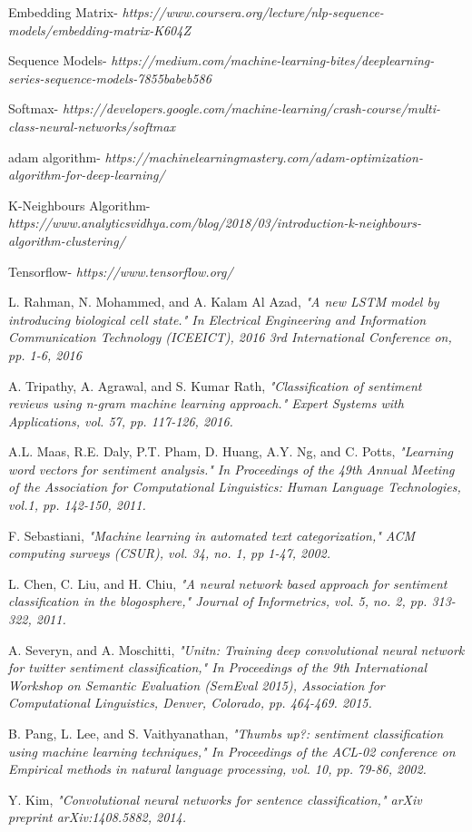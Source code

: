 \documentclass[conference]{IEEEtran}
\begin{document}
\begin{thebibliography}{00}
Embedding Matrix-
{\em https://www.coursera.org/lecture/nlp-sequence-models/embedding-matrix-K604Z}

Sequence Models-
{\em https://medium.com/machine-learning-bites/deeplearning-series-sequence-models-7855babeb586}

Softmax-
{\em https://developers.google.com/machine-learning/crash-course/multi-class-neural-networks/softmax}

adam algorithm-
{\em https://machinelearningmastery.com/adam-optimization-algorithm-for-deep-learning/}

K-Neighbours Algorithm-
{\em https://www.analyticsvidhya.com/blog/2018/03/introduction-k-neighbours-algorithm-clustering/}

Tensorflow-
{\em https://www.tensorflow.org/}

L. Rahman, N. Mohammed, and A. Kalam Al Azad,
{\em  "A new LSTM
model by introducing biological cell state." In Electrical Engineering
and Information Communication Technology (ICEEICT), 2016 3rd
International Conference on, pp. 1-6, 2016}

A. Tripathy, A. Agrawal, and S. Kumar Rath,
{\em  "Classification of
sentiment reviews using n-gram machine learning approach." Expert
Systems with Applications, vol. 57, pp. 117-126, 2016. }

 A.L. Maas, R.E. Daly, P.T. Pham, D. Huang, A.Y. Ng, and C. Potts,
{\em
"Learning word vectors for sentiment analysis." In Proceedings of the
49th Annual Meeting of the Association for Computational Linguistics:
Human Language Technologies, vol.1, pp. 142-150, 2011.}

 F. Sebastiani,
{\em
 "Machine learning in automated text categorization," ACM
computing surveys (CSUR), vol. 34, no. 1, pp 1-47, 2002. }

 L. Chen, C. Liu, and H. Chiu,
{\em
 "A neural network based approach for
sentiment classification in the blogosphere," Journal of Informetrics,
vol. 5, no. 2, pp. 313-322, 2011. }

 A. Severyn, and A. Moschitti, 
{\em
 "Unitn: Training deep convolutional
neural network for twitter sentiment classification," In Proceedings of
the 9th International Workshop on Semantic Evaluation (SemEval
2015), Association for Computational Linguistics, Denver, Colorado, pp.
464-469. 2015. }

B. Pang, L. Lee, and S. Vaithyanathan,
{\em
 "Thumbs up?: sentiment
classification using machine learning techniques," In Proceedings of the
ACL-02 conference on Empirical methods in natural language
processing, vol. 10, pp. 79-86, 2002.}

 Y. Kim,
{\em
 "Convolutional neural networks for sentence classification,"
arXiv preprint arXiv:1408.5882, 2014. }

\end{thebibliography}
\vspace{12pt}
\end{document}
